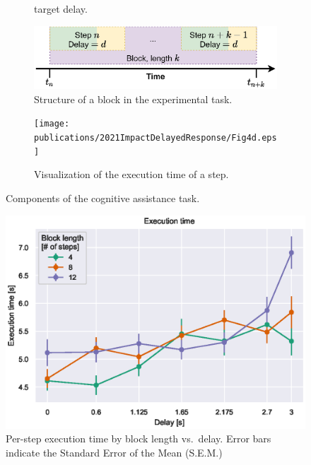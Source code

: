 \begin{figure}[h]
\begin{subfigure}[t]{.49\textwidth}
{        target delay.}%
        \label{fig:cogassist:step:delay}
    \end{subfigure}
    \medskip%
    \begin{subfigure}[t]{.49\textwidth}
        \centering
        \includegraphics[width=\textwidth]{publications/2021ImpactDelayedResponse/Fig4c.eps}
        \caption{Structure of a block in the experimental task.}%
        \label{fig:cogassist:block}
    \end{subfigure}%
    \hfill%
    \begin{subfigure}[t]{.49\textwidth}
        \centering
        \texttt{[image: publications/2021ImpactDelayedResponse/Fig4d.eps]}
        \caption{Visualization of the execution time of a step.}%
        \label{fig:exectime:diagram}
    \end{subfigure}%
    \caption{Components of the cognitive assistance task.}
\end{figure}

\begin{figure}[h]
    \centering
    \includegraphics[width=.8\textwidth]{publications/2021ImpactDelayedResponse/Fig6.eps}
    \caption{Per-step execution time by block length vs.\ delay. Error bars indicate the Standard Error of the Mean
        (S.E.M.)}\label{fig:exectime}%
\end{figure}

